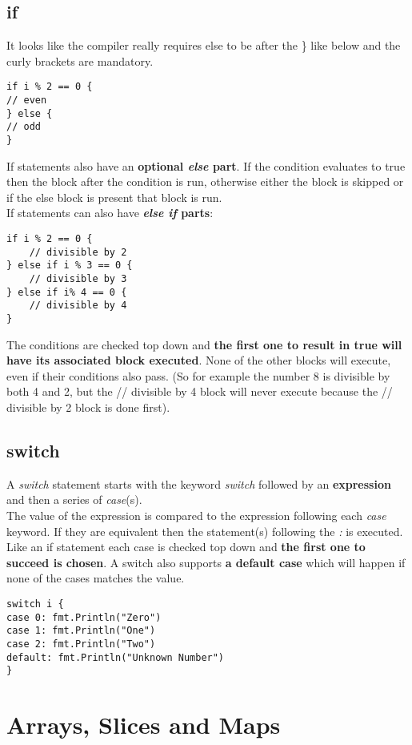 \documentclass[10pt,letterpaper]{report}
\begin{document}
\section{if}
It looks like the compiler really requires else to be after the \} like below and the curly brackets are mandatory.
\begin{lstlisting}
if i % 2 == 0 {
// even
} else {
// odd
}
\end{lstlisting}
If statements also have an \textbf{optional \textit{else} part}. If the condition evaluates to true then the block after the condition is run, otherwise either the block is skipped or if the else block is present that block is run.\\
If statements can also have \textbf{\textit{else if} parts}:
\begin{lstlisting}
if i % 2 == 0 {
	// divisible by 2
} else if i % 3 == 0 {
	// divisible by 3
} else if i% 4 == 0 {
	// divisible by 4
}
\end{lstlisting}
The conditions are checked top down and \textbf{the first one to result in true will have its associated block executed}. None of the other blocks will execute, even if their conditions also pass. (So for example the number 8 is divisible by both 4 and 2, but the // divisible by 4 block will never execute because the // divisible by 2 block is done first).
\section{switch}
A \textit{switch} statement starts with the keyword \textit{switch} followed by an \textbf{expression} and then a series of \textit{case}(s).\\
The value of the expression is compared to the expression following each \textit{case} keyword. If they are equivalent then the statement(s) following the \textit{:} is executed.\\
Like an if statement each case is checked top down and \textbf{the first one to succeed is chosen}. A switch also supports \textbf{a default case} which will happen if none of the cases matches the value.
\begin{lstlisting}
switch i {
case 0: fmt.Println("Zero")
case 1: fmt.Println("One")
case 2: fmt.Println("Two")
default: fmt.Println("Unknown Number")
}
\end{lstlisting}
\chapter{Arrays, Slices and Maps}
\end{document}
